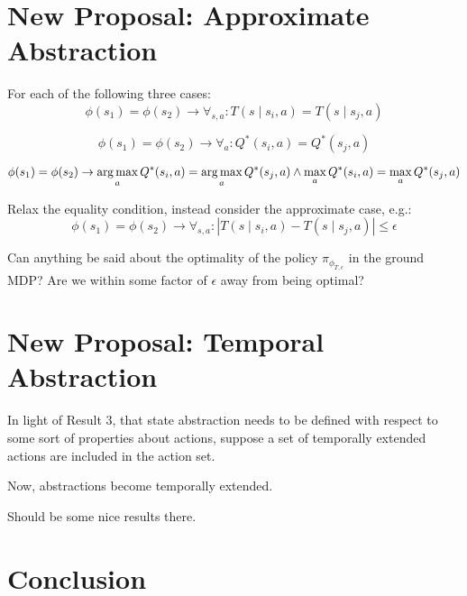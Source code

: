 \documentclass[11pt]{amsart}
\begin{document}
\midline

\newpage
\section{New Proposal: Approximate Abstraction}


For each of the following three cases:
\begin{equation}
 \phi(s_1) = \phi(s_2) \rightarrow \forall_{s,a} : T(s \mid s_i, a) = T(s \mid s_j, a)
\end{equation}

\begin{equation}
 \phi(s_1) = \phi(s_2) \rightarrow \forall_a : Q^*(s_i, a) = Q^*(s_j, a)
\end{equation}

\begin{equation}
 \phi(s_1) = \phi(s_2) \rightarrow \operatorname*{arg\,max}_a Q^*(s_i, a) = \operatorname*{arg\,max}_a Q^*(s_j, a) \wedge \max_a Q^*(s_i, a) = \max_a Q^*(s_j, a)
\end{equation}

Relax the equality condition, instead consider the approximate case, e.g.:
\begin{equation}
 \phi(s_1) = \phi(s_2) \rightarrow \forall_{s,a} : |T(s \mid s_i, a) - T(s \mid s_j, a)| \leq \epsilon
\end{equation}

 Can anything be said about the optimality of the policy $\pi_{\phi_{T,\epsilon}}$ in the ground MDP? Are we within some factor of $\epsilon$ away from being optimal?


\newpage
\section{New Proposal: Temporal Abstraction}

In light of Result 3, that state abstraction needs to be defined with respect to some sort of properties about actions, suppose a set of temporally extended actions are included in the action set.

Now, abstractions become temporally extended.

Should be some nice results there.




\newpage
\section{Conclusion}
\end{document}
